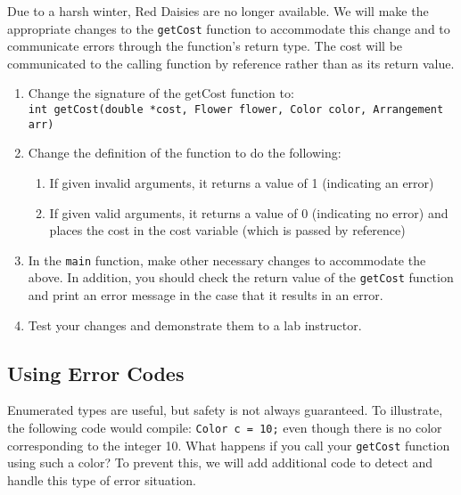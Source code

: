 \documentclass[12pt]{scrartcl}
\begin{document}
Due to a harsh winter, Red Daisies are no longer available.  We will make the 
appropriate changes to the \texttt{getCost} function to accommodate this 
change and to communicate errors through the function's return type.  The cost 
will be communicated to the calling function by reference rather than as its return 
value.
\begin{enumerate}
  \item Change the signature of the getCost function to: \\
	\texttt{int getCost(double *cost, Flower flower, Color  color, Arrangement arr)}
  \item Change the definition of the function to do the following:
  	\begin{enumerate}
	  \item If given invalid arguments, it returns a value of 1 (indicating an error)
	  \item If given valid arguments, it returns a value of 0 (indicating no error) and 
		places the cost in the cost variable (which is passed by reference)
	\end{enumerate}
  \item In the \texttt{main} function, make other necessary changes to 
	accommodate the above.  In addition, you should check the return value 
	of the \texttt{getCost} function and print an error message in the case 
	that it results in an error. 
  \item Test your changes and demonstrate them to a lab instructor.
\end{enumerate}

\subsection{Using Error Codes}

Enumerated types are useful, but safety is not always guaranteed.  To illustrate, 
the following code would compile: \texttt{Color c = 10;} even though there is no color 
corresponding to the integer 10.  What happens if you call your \texttt{getCost} 
function using such a color?  To prevent this, we will add additional code to detect 
and handle this type of error situation.
\end{document}
